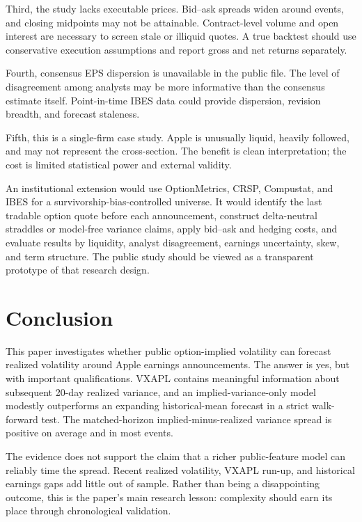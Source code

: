 \documentclass[11pt]{article}
\begin{document}
Third, the study lacks executable prices. Bid--ask spreads widen around events, and closing midpoints may not be attainable. Contract-level volume and open interest are necessary to screen stale or illiquid quotes. A true backtest should use conservative execution assumptions and report gross and net returns separately.

Fourth, consensus EPS dispersion is unavailable in the public file. The level of disagreement among analysts may be more informative than the consensus estimate itself. Point-in-time IBES data could provide dispersion, revision breadth, and forecast staleness.

Fifth, this is a single-firm case study. Apple is unusually liquid, heavily followed, and may not represent the cross-section. The benefit is clean interpretation; the cost is limited statistical power and external validity.

An institutional extension would use OptionMetrics, CRSP, Compustat, and IBES for a survivorship-bias-controlled universe. It would identify the last tradable option quote before each announcement, construct delta-neutral straddles or model-free variance claims, apply bid--ask and hedging costs, and evaluate results by liquidity, analyst disagreement, earnings uncertainty, skew, and term structure. The public study should be viewed as a transparent prototype of that research design.

\section{Conclusion}

This paper investigates whether public option-implied volatility can forecast realized volatility around Apple earnings announcements. The answer is yes, but with important qualifications. VXAPL contains meaningful information about subsequent 20-day realized variance, and an implied-variance-only model modestly outperforms an expanding historical-mean forecast in a strict walk-forward test. The matched-horizon implied-minus-realized variance spread is positive on average and in most events.

The evidence does not support the claim that a richer public-feature model can reliably time the spread. Recent realized volatility, VXAPL run-up, and historical earnings gaps add little out of sample. Rather than being a disappointing outcome, this is the paper's main research lesson: complexity should earn its place through chronological validation.
\end{document}
